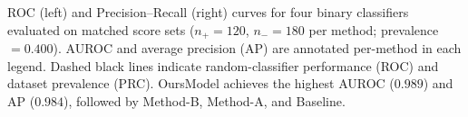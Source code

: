 \caption{ROC (left) and Precision–Recall (right) curves for four binary classifiers evaluated on matched score sets ($n_+{=}120$, $n_-{=}180$ per method; prevalence~$=0.400$). AUROC and average precision (AP) are annotated per-method in each legend. Dashed black lines indicate random-classifier performance (ROC) and dataset prevalence (PRC). OursModel achieves the highest AUROC ($0.989$) and AP ($0.984$), followed by Method-B, Method-A, and Baseline.}
